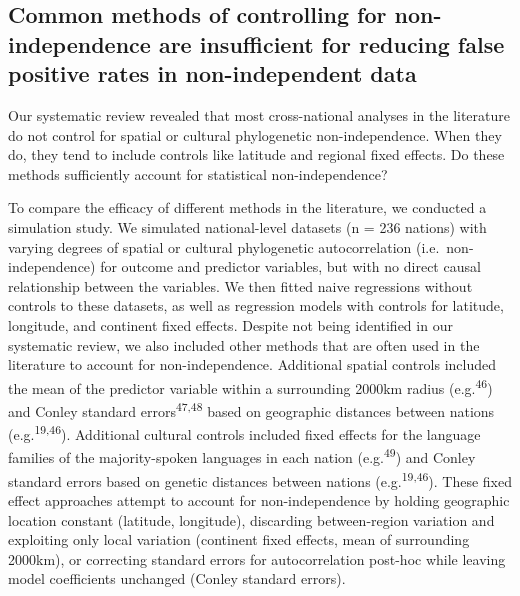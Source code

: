 \documentclass[
  man,floatsintext]{apa6}
\begin{document}
\hypertarget{common-methods-of-controlling-for-non-independence-are-insufficient-for-reducing-false-positive-rates-in-non-independent-data}{%
\subsection{Common methods of controlling for non-independence are insufficient for reducing false positive rates in non-independent data}\label{common-methods-of-controlling-for-non-independence-are-insufficient-for-reducing-false-positive-rates-in-non-independent-data}}

Our systematic review revealed that most cross-national analyses in the literature do not control for spatial or cultural phylogenetic non-independence. When they do, they tend to include controls like latitude and regional fixed effects. Do these methods sufficiently account for statistical non-independence?

To compare the efficacy of different methods in the literature, we conducted a simulation study. We simulated national-level datasets (n = 236 nations) with varying degrees of spatial or cultural phylogenetic autocorrelation (i.e.~non-independence) for outcome and predictor variables, but with no direct causal relationship between the variables. We then fitted naive regressions without controls to these datasets, as well as regression models with controls for latitude, longitude, and continent fixed effects. Despite not being identified in our systematic review, we also included other methods that are often used in the literature to account for non-independence. Additional spatial controls included the mean of the predictor variable within a surrounding 2000km radius (e.g.\textsuperscript{46}) and Conley standard errors\textsuperscript{47,48} based on geographic distances between nations (e.g.\textsuperscript{19,46}). Additional cultural controls included fixed effects for the language families of the majority-spoken languages in each nation (e.g.\textsuperscript{49}) and Conley standard errors based on genetic distances between nations (e.g.\textsuperscript{19,46}). These fixed effect approaches attempt to account for non-independence by holding geographic location constant (latitude, longitude), discarding between-region variation and exploiting only local variation (continent fixed effects, mean of surrounding 2000km), or correcting standard errors for autocorrelation post-hoc while leaving model coefficients unchanged (Conley standard errors).
\end{document}
